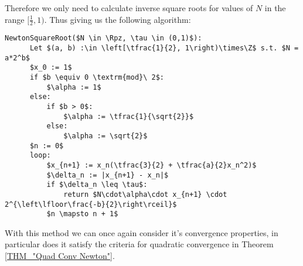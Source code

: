 Therefore we only need to calculate inverse square roots for values of \(N\) in the range \([\tfrac{1}{2}, 1)\). Thus giving us the following algorithm:\\

\begin{lstlisting}[frame=single,mathescape,caption={Newton Inverse Square Root Method},label={PCD_"Newton Inverse Square Root"}]
  NewtonSquareRoot($N \in \Rpz, \tau \in (0,1)$):
      Let $(a, b) :\in \left[\tfrac{1}{2}, 1\right)\times\Z$ s.t. $N = a*2^b$
      $x_0 := 1$
      if $b \equiv 0 \textrm{mod}\ 2$:
          $\alpha := 1$
      else:
          if $b > 0$:
              $\alpha := \tfrac{1}{\sqrt{2}}$
          else:
              $\alpha := \sqrt{2}$
      $n := 0$
      loop:
          $x_{n+1} := x_n(\tfrac{3}{2} + \tfrac{a}{2}x_n^2)$
          $\delta_n := |x_{n+1} - x_n|$
          if $\delta_n \leq \tau$:
              return $N\cdot\alpha\cdot x_{n+1} \cdot 2^{\left\lfloor\frac{-b}{2}\right\rceil}$
          $n \mapsto n + 1$
\end{lstlisting}

With this method we can once again consider it's convergence properties, in particular does it satisfy the criteria for quadratic convergence in Theorem \ref{THM_"Quad Conv Newton"}.

